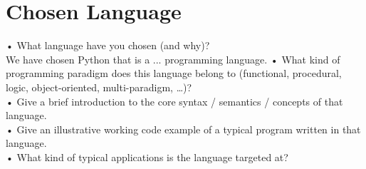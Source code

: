 \section{Chosen Language}
•	What language have you chosen (and why)?\\
We have chosen Python that is a ... programming language.
•	What kind of programming paradigm does this language belong to (functional, procedural, logic, object-oriented, multi-paradigm, …)?\\
•	Give a brief introduction to the core syntax / semantics / concepts of that language.\\
•	Give an illustrative working code example of a typical program written in that language.\\




•	What kind of typical applications is the language targeted at?\\